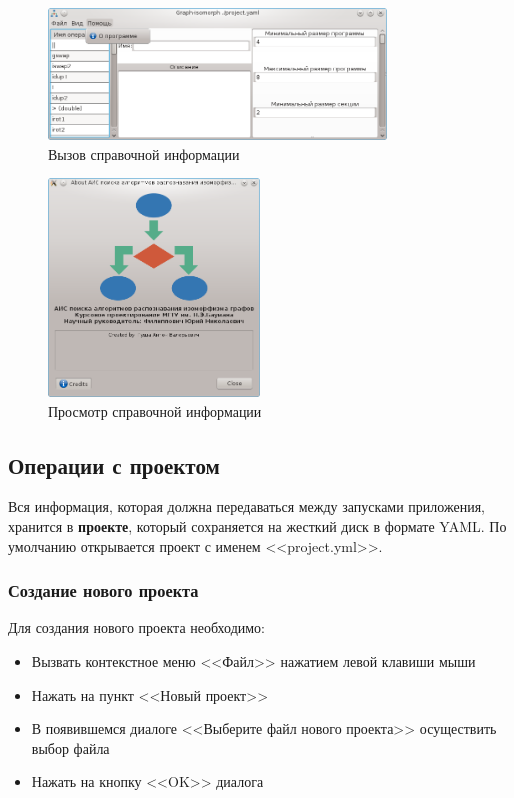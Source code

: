 \documentclass[russian,utf8,emptystyle]{eskdtext}
\begin{document}
\begin{figure}[h!]
\centering
\includegraphics[width=0.8\textwidth]{screen02}
\caption{Вызов справочной информации}
\end{figure}

\begin{figure}[h!]
\centering
\includegraphics[width=0.5\textwidth]{screen03}
\caption{Просмотр справочной информации}
\end{figure}

\subsection{Операции с проектом}
Вся информация, которая должна передаваться между запусками приложения, хранится в \textbf{проекте}, который сохраняется на жесткий диск в формате YAML. По умолчанию открывается проект с именем <<project.yml>>.

\subsubsection{Создание нового проекта}
Для создания нового проекта необходимо:
\begin{itemize}
\item Вызвать контекстное меню <<Файл>> нажатием левой клавиши мыши
\item Нажать на пункт <<Новый проект>>
\item В появившемся диалоге <<Выберите файл нового проекта>> осуществить выбор файла
\item Нажать на кнопку <<OK>> диалога
\end{itemize}
\end{document}
